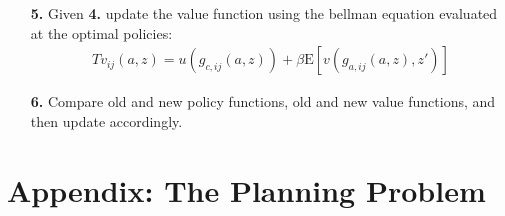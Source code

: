 \documentclass[12pt,pdftex]{article}
\begin{document}
\begin{onehalfspacing}
\begin{itemize}
\item[\textbf{5.}] Given \textbf{4.} update the value function using the bellman equation evaluated at the optimal policies:
\begin{align}
Tv_{ij}(a, z) = u(g_{c,ij}(a,z)) + \beta \mathrm{E}\left[ v(g_{a,ij}(a,z), z') \right]
\end{align}

\item[\textbf{6.}] Compare old and new policy functions, old and new value functions, and then update accordingly.


%
\end{itemize}

\section{Appendix: The Planning Problem}\label{sec:apx-planner}


\end{onehalfspacing}
\end{document}
